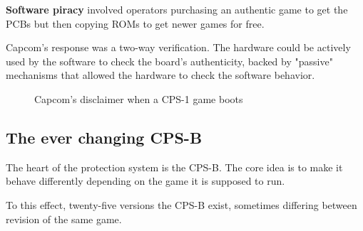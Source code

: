 \textbf{Software piracy} involved operators purchasing an authentic game to get the PCBs but then copying ROMs to get newer games for free. 

Capcom's response was a two-way verification. The hardware could be actively used by the software to check the board's authenticity, backed by "passive" mechanisms that allowed the hardware to check the software behavior.

\begin{figure}[H]
\caption*{Capcom's disclaimer when a CPS-1 game boots}
\end{figure}

\subsection{The ever changing CPS-B}
The heart of the protection system is the CPS-B. The core idea is to make it behave differently depending on the game it is supposed to run.

To this effect, twenty-five versions the CPS-B exist\cite{mame_cps1_video}, sometimes differing between revision of the same game\cite{cpsBNumbers}.


